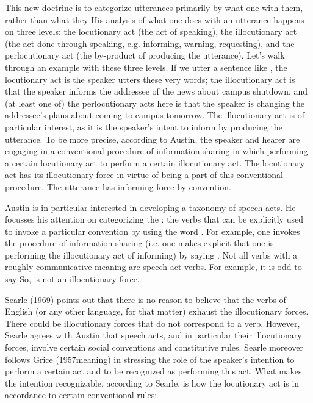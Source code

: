 This new doctrine is to categorize utterances primarily by what one  with them, rather than what they  His analysis of what one does with an utterance happens on three levels: the locutionary act (the act of speaking), the illocutionary act (the act done through speaking, e.g. informing, warning, requesting), and the perlocutionary act (the by-product of producing the utterance). Let’s walk through an example with these three levels. If we utter a sentence like , the locutionary act is the speaker utters these very words; the illocutionary act is that the speaker informs the addressee of the news about campus shutdown, and (at least one of) the perlocutionary acts here is that the speaker is changing the addressee’s plans about coming to campus tomorrow. The illocutionary act is of particular interest, as it is the speaker’s intent to inform by producing the utterance. To be more precise, according to Austin, the speaker and hearer are engaging in a conventional procedure of information sharing in which performing a certain locutionary act  to perform a certain illocutionary act. The locutionary act has its illocutionary force in virtue of being a part of this conventional procedure. The utterance has informing force by convention.

Austin is in particular interested in developing a taxonomy of speech acts. He focusses his attention on categorizing the : the verbs that can be explicitly used to invoke a particular convention by using the word . For example, one invokes the procedure of information sharing (i.e. one makes explicit that one is performing the illocutionary act of informing) by saying . Not all verbs with a roughly communicative meaning are speech act verbs. For example, it is odd to say  So,  is not an illocutionary force.

Searle (1969) points out that there is no reason to believe that the verbs of English (or any other language, for that matter) exhaust the illocutionary forces. There could be illocutionary forces that do not correspond to a verb. However, Searle agrees with Austin that speech acts, and in particular their illocutionary forces, involve certain social conventions and constitutive rules. Searle moreover follows Grice (1957meaning) in stressing the role of the speaker’s intention to perform a certain act and to be recognized as performing this act. What makes the intention recognizable, according to Searle, is how the locutionary act is in accordance to certain conventional rules:

